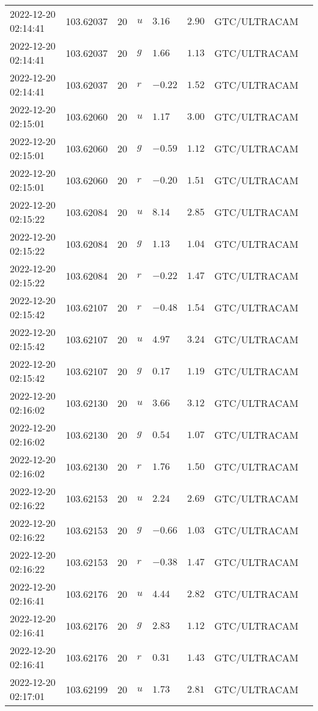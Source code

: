 \documentclass{nature_plusfigure}
\begin{document}
\begin{supplement}
\begin{center}
\begin{longtable}{llllllll}
2022-12-20 02:14:41 & 103.62037 & 20 & $u$ & $3.16$ & $2.90$ & GTC/ULTRACAM &  \\ 
2022-12-20 02:14:41 & 103.62037 & 20 & $g$ & $1.66$ & $1.13$ & GTC/ULTRACAM &  \\ 
2022-12-20 02:14:41 & 103.62037 & 20 & $r$ & $-0.22$ & $1.52$ & GTC/ULTRACAM &  \\ 
2022-12-20 02:15:01 & 103.62060 & 20 & $u$ & $1.17$ & $3.00$ & GTC/ULTRACAM &  \\ 
2022-12-20 02:15:01 & 103.62060 & 20 & $g$ & $-0.59$ & $1.12$ & GTC/ULTRACAM &  \\ 
2022-12-20 02:15:01 & 103.62060 & 20 & $r$ & $-0.20$ & $1.51$ & GTC/ULTRACAM &  \\ 
2022-12-20 02:15:22 & 103.62084 & 20 & $u$ & $8.14$ & $2.85$ & GTC/ULTRACAM &  \\ 
2022-12-20 02:15:22 & 103.62084 & 20 & $g$ & $1.13$ & $1.04$ & GTC/ULTRACAM &  \\ 
2022-12-20 02:15:22 & 103.62084 & 20 & $r$ & $-0.22$ & $1.47$ & GTC/ULTRACAM &  \\ 
2022-12-20 02:15:42 & 103.62107 & 20 & $r$ & $-0.48$ & $1.54$ & GTC/ULTRACAM &  \\ 
2022-12-20 02:15:42 & 103.62107 & 20 & $u$ & $4.97$ & $3.24$ & GTC/ULTRACAM &  \\ 
2022-12-20 02:15:42 & 103.62107 & 20 & $g$ & $0.17$ & $1.19$ & GTC/ULTRACAM &  \\ 
2022-12-20 02:16:02 & 103.62130 & 20 & $u$ & $3.66$ & $3.12$ & GTC/ULTRACAM &  \\ 
2022-12-20 02:16:02 & 103.62130 & 20 & $g$ & $0.54$ & $1.07$ & GTC/ULTRACAM &  \\ 
2022-12-20 02:16:02 & 103.62130 & 20 & $r$ & $1.76$ & $1.50$ & GTC/ULTRACAM &  \\ 
2022-12-20 02:16:22 & 103.62153 & 20 & $u$ & $2.24$ & $2.69$ & GTC/ULTRACAM &  \\ 
2022-12-20 02:16:22 & 103.62153 & 20 & $g$ & $-0.66$ & $1.03$ & GTC/ULTRACAM &  \\ 
2022-12-20 02:16:22 & 103.62153 & 20 & $r$ & $-0.38$ & $1.47$ & GTC/ULTRACAM &  \\ 
2022-12-20 02:16:41 & 103.62176 & 20 & $u$ & $4.44$ & $2.82$ & GTC/ULTRACAM &  \\ 
2022-12-20 02:16:41 & 103.62176 & 20 & $g$ & $2.83$ & $1.12$ & GTC/ULTRACAM &  \\ 
2022-12-20 02:16:41 & 103.62176 & 20 & $r$ & $0.31$ & $1.43$ & GTC/ULTRACAM &  \\ 
2022-12-20 02:17:01 & 103.62199 & 20 & $u$ & $1.73$ & $2.81$ & GTC/ULTRACAM &  \\ 

\end{longtable}
\end{center}
\end{supplement}
\end{document}
